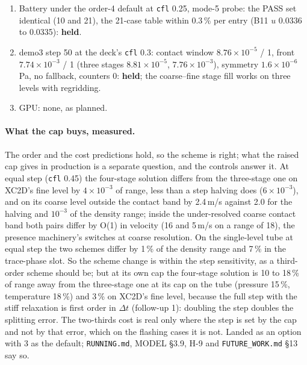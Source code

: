 \documentclass[11pt,a4paper]{article}
\newcommand{\code}[1]{\texttt{\small #1}}
\newcommand{\Dt}{\Delta t}
\begin{document}
\begin{enumerate}[nosep]
      49.0\,s against 75.5\,s (0.65), XC2D 2.40\,s against 3.80\,s (0.63),
      ADV2D 0.65: \textbf{held} at the predicted two thirds.  At equal
      step the four stages cost a third more (the tube 87.7\,s at
      \code{cfl} 0.45; demo3 14.3\,s against 11.7).
\item Battery under the order-4 default at \code{cfl} 0.25, mode-5
      probe: the PASS set identical (10 and 21), the 21-case table
      within 0.3\,\% per entry (B11 $u$ 0.0336 to 0.0335): \textbf{held}.
\item demo3 step 50 at the deck's \code{cfl} 0.3: contact window
      $8.76\times10^{-5}$ / 1, front $7.74\times10^{-3}$ / 1 (three
      stages $8.81\times10^{-5}$, $7.76\times10^{-3}$), symmetry
      $1.6\times10^{-6}$\,Pa, no fallback, counters 0: \textbf{held}; the
      coarse--fine stage fill works on three levels with regridding.
\item GPU: none, as planned.
\end{enumerate}

\paragraph{What the cap buys, measured.}  The order and the cost
predictions hold, so the scheme is right; what the raised cap gives in
production is a separate question, and the controls answer it.  At
equal step (\code{cfl} 0.45) the four-stage solution differs from the
three-stage one on XC2D's fine level by $4\times10^{-3}$ of range, less
than a step halving does ($6\times10^{-3}$), and on its coarse level
outside the contact band by 2.4\,m/s against 2.0 for the halving and
$10^{-3}$ of the density range; inside the under-resolved coarse
contact band both pairs differ by O(1) in velocity (16 and 5\,m/s on a
range of 18), the presence machinery's switches at coarse resolution.
On the single-level tube at equal step the two schemes differ by 1\,\%
of the density range and 7\,\% in the trace-phase slot.  So the scheme
change is within the step sensitivity, as a third-order scheme should
be; but at its own cap the four-stage solution is 10 to 18\,\% of range
away from the three-stage one at its cap on the tube (pressure 15\,\%,
temperature 18\,\%) and 3\,\% on XC2D's fine level, because the full
step with the stiff relaxation is first order in $\Dt$ (follow-up 1):
doubling the step doubles the splitting error.  The two-thirds cost is
real only where the step is set by the cap and not by that error, which
on the flashing cases it is not.  Landed as an option with 3 as the
default; \code{RUNNING.md}, MODEL \S3.9, H-9 and
\code{FUTURE\_WORK.md} \S13 say so.
\end{document}
